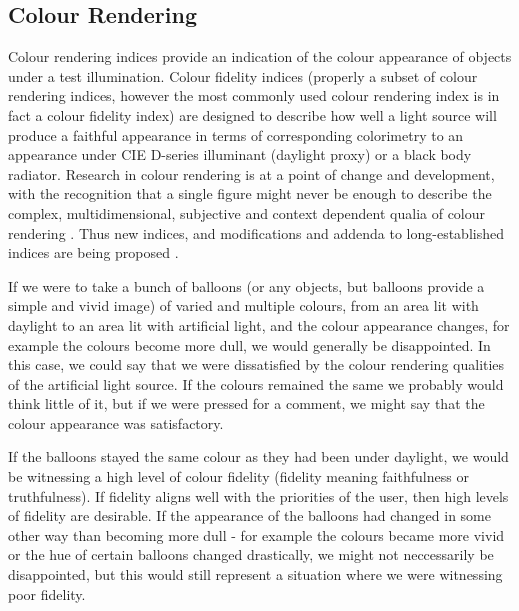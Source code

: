 \subsection{Colour Rendering}

Colour rendering indices provide an indication of the colour appearance of objects under a test illumination. Colour fidelity indices (properly a subset of colour rendering indices, however the most commonly used colour rendering index is in fact a colour fidelity index) are designed to describe how well a light source will produce a faithful appearance in terms of corresponding colorimetry to an appearance under \gls{CIE} D-series illuminant (daylight proxy) or a black body radiator. %
Research in colour rendering is at a point of change and development, with the recognition that a single figure might never be enough to describe the complex, multidimensional, subjective and context dependent qualia of colour rendering \citep{rea_color_2008}. Thus new indices, and modifications and addenda to long-established indices are being proposed \citep{smet_memory_2012,davis_color_2010,rea_practical_2010,ies_ies_2015,teunissen_characterising_2016}.

If we were to take a bunch of balloons (or any objects, but balloons provide a simple and vivid image) of varied and multiple colours, from an area lit with daylight to an area lit with artificial light, and the colour appearance changes, for example the colours become more dull, we would generally be disappointed. In this case, we could say that we were dissatisfied by the colour rendering qualities of the artificial light source. If the colours remained the same we probably would think little of it, but if we were pressed for a comment, we might say that the colour appearance was satisfactory. 

If the balloons stayed the same colour as they had been under daylight, we would be witnessing a high level of colour fidelity (fidelity meaning faithfulness or truthfulness). If fidelity aligns well with the priorities of the user, then high levels of fidelity are desirable. If the appearance of the balloons had changed in some other way than becoming more dull - for example the colours became more vivid or the hue of certain balloons changed drastically, we might not neccessarily be disappointed, but this would still represent a situation where we were witnessing poor fidelity.

